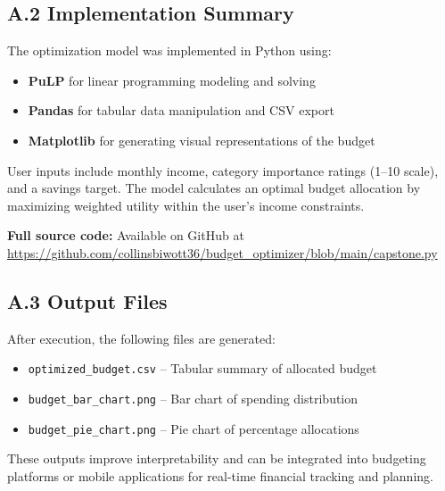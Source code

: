 \documentclass{article}
\begin{document}
\subsection*{A.2 Implementation Summary}

The optimization model was implemented in Python using:
\begin{itemize}
    \item \textbf{PuLP} for linear programming modeling and solving
    \item \textbf{Pandas} for tabular data manipulation and CSV export
    \item \textbf{Matplotlib} for generating visual representations of the budget
\end{itemize}

User inputs include monthly income, category importance ratings (1–10 scale), and a savings target. The model calculates an optimal budget allocation by maximizing weighted utility within the user’s income constraints.

\textbf{Full source code:} Available on GitHub at\\
\url{https://github.com/collinsbiwott36/budget_optimizer/blob/main/capstone.py}

\subsection*{A.3 Output Files}

After execution, the following files are generated:
\begin{itemize}
    \item \texttt{optimized\_budget.csv} – Tabular summary of allocated budget
    \item \texttt{budget\_bar\_chart.png} – Bar chart of spending distribution
    \item \texttt{budget\_pie\_chart.png} – Pie chart of percentage allocations
\end{itemize}

These outputs improve interpretability and can be integrated into budgeting platforms or mobile applications for real-time financial tracking and planning.
\end{document}
